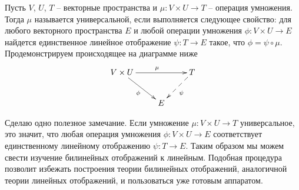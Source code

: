 \begin{definition}
Пусть $V$, $U$, $T$ -- векторные пространства и $\mu \colon V\times U \to T$ -- операция умножения. Тогда $\mu$ называется универсальной, если выполняется следующее свойство: для любого векторного пространства $E$ и любой операции умножения $\phi \colon V\times U\to E$ найдется единственное линейное отображение $\psi\colon T\to E$ такое, что $\phi = \psi \circ \mu$. Продемонстрируем происходящее на диаграмме ниже
\[
\xymatrix{
	{V\times U}\ar[rr]^{\mu}\ar[rd]_{\phi}&{}&{T}\ar@{-->}[dl]^{\psi}\\
	{}&{E}&{}
}
\]
\end{definition}
Сделаю одно полезное замечание. Если умножение $\mu\colon V\times U\to T$ универсальное, это значит, что любая операция умножения $\phi \colon V\times U \to E$ соответствует единственному линейному отображению $\psi\colon T\to E$. Таким образом мы можем свести изучение билинейных отображений к линейным. Подобная процедура позволит избежать построения теории билинейных отображений, аналогичной теории линейных отображений, и пользоваться уже готовым аппаратом.

